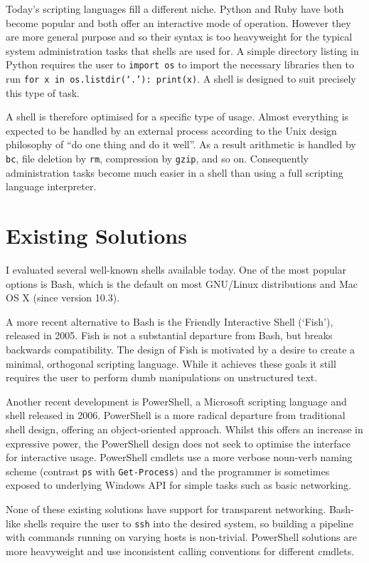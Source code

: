 \documentclass[12pt,twoside,notitlepage]{report}
\begin{document}
Today's scripting languages fill a different niche. Python and Ruby
have both become popular and both offer an interactive mode of
operation. However they are more general purpose and so their syntax
is too heavyweight for the typical system administration tasks that
shells are used for. A simple directory listing in Python requires the
user to {\tt import os} to import the necessary libraries then to run
{\tt for x in os.listdir(`.'): print(x)}. A shell is designed to suit
precisely this type of task.

A shell is therefore optimised for a specific type of usage. Almost
everything is expected to be handled by an external process according
to the Unix design philosophy of ``do one thing and do it well''. As a
result arithmetic is handled by {\tt bc}, file deletion by {\tt rm},
compression by {\tt gzip}, and so on. Consequently administration
tasks become much easier in a shell than using a full scripting
language interpreter.

\section{Existing Solutions}
I evaluated several well-known shells available today. One of the most popular
options is Bash, which is the default on most GNU/Linux distributions
and Mac OS X (since version 10.3).

A more recent alternative to Bash is the Friendly Interactive Shell (`Fish'),
released in 2005. Fish is not a substantial departure from Bash, but breaks
backwards compatibility. The design of Fish \cite{fishdesign} is motivated by a
desire to create a minimal, orthogonal scripting language. While it achieves
these goals it still requires the user to perform dumb manipulations on
unstructured text.

Another recent development is PowerShell, a Microsoft scripting
language and shell released in 2006. PowerShell is a more radical
departure from traditional shell design, offering an object-oriented
approach. Whilst this offers an increase in expressive power, the
PowerShell design does not seek to optimise the interface for
interactive usage. PowerShell cmdlets use a more verbose noun-verb
naming scheme (contrast {\tt ps} with {\tt Get-Process}) and the
programmer is sometimes exposed to underlying Windows API for simple
tasks such as basic networking.

None of these existing solutions have support for transparent
networking. Bash-like shells require the user to {\tt ssh} into the
desired system, so building a pipeline with commands running on
varying hosts is non-trivial. PowerShell solutions are more
heavyweight and use inconsistent calling conventions for different
cmdlets.
\end{document}
